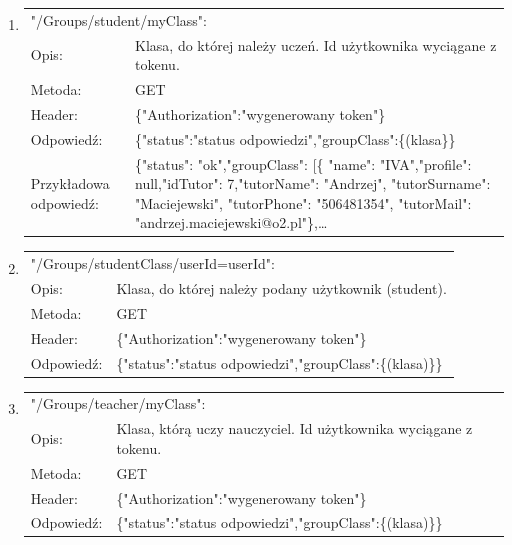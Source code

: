 \documentclass[12pt, titlepage]{article}
\begin{document}
\begin{enumerate}
	\item 
	{\renewcommand{\arraystretch}{1.5}
	\begin{tabular}[t]{p{3cm} p{15cm}}
	\multicolumn{2}{l}{"/Groups/student/myClass":} \\
	Opis: &  Klasa, do której należy uczeń. \newline Id użytkownika wyciągane z tokenu.\\
	Metoda: & GET \\
	Header: & \{"Authorization":"wygenerowany token"\} \\
	Odpowiedź: & \{"status":"status odpowiedzi",\newline "groupClass":\{(klasa\}\} \\
	Przykładowa \newline odpowiedź: & \{"status": "ok",\newline "groupClass": [\newline \{ "name": "IVA",\newline "profile": null,\newline "idTutor": 7,\newline "tutorName": "Andrzej", \newline "tutorSurname": "Maciejewski", \newline
	"tutorPhone": "506481354",\newline
        "tutorMail": "andrzej.maciejewski@o2.pl"\},\newline \ldots
	\end{tabular}}
	
	\item 
	{\renewcommand{\arraystretch}{1.5}
	\begin{tabular}[t]{p{3cm} p{15cm}}
	\multicolumn{2}{l}{"/Groups/studentClass/userId={userId}":} \\
	Opis: &  Klasa, do której należy podany użytkownik (student). \\
	Metoda: & GET \\
	Header: & \{"Authorization":"wygenerowany token"\} \\
	Odpowiedź: & \{"status":"status odpowiedzi",\newline "groupClass":\{(klasa)\}\}
	\end{tabular}}
	
	\item 
	{\renewcommand{\arraystretch}{1.5}
	\begin{tabular}[t]{p{3cm} p{15cm}}
	\multicolumn{2}{l}{"/Groups/teacher/myClass":} \\
	Opis: &  Klasa, którą uczy nauczyciel. \newline Id użytkownika wyciągane z tokenu.\\
	Metoda: & GET \\
	Header: & \{"Authorization":"wygenerowany token"\} \\
	Odpowiedź: & \{"status":"status odpowiedzi",\newline "groupClass":\{(klasa)\}\}
	\end{tabular}}
	

\end{enumerate}
\end{document}
